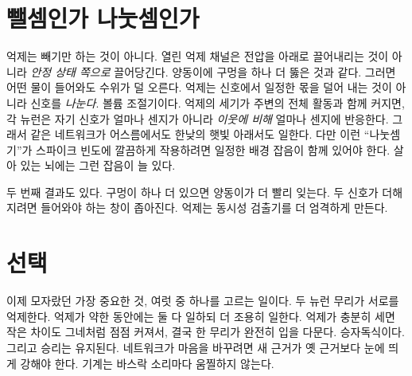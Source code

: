 \section*{뺄셈인가 나눗셈인가}

억제는 빼기만 하는 것이 아니다. 열린 억제 채널은 전압을 아래로 끌어내리는 것이 아니라 \emph{안정 상태 쪽으로} 끌어당긴다. 양동이에 구멍을 하나 더 뚫은 것과 같다. 그러면 어떤 물이 들어와도 수위가 덜 오른다. 억제는 신호에서 일정한 몫을 덜어 내는 것이 아니라 신호를 \emph{나눈다}. 볼륨 조절기이다. 억제의 세기가 주변의 전체 활동과 함께 커지면, 각 뉴런은 자기 신호가 얼마나 센지가 아니라 \emph{이웃에 비해} 얼마나 센지에 반응한다. 그래서 같은 네트워크가 어스름에서도 한낮의 햇빛 아래서도 일한다. 다만 이런 “나눗셈기”가 스파이크 빈도에 깔끔하게 작용하려면 일정한 배경 잡음이 함께 있어야 한다. 살아 있는 뇌에는 그런 잡음이 늘 있다.


두 번째 결과도 있다. 구멍이 하나 더 있으면 양동이가 더 빨리 잊는다. 두 신호가 더해지려면 들어와야 하는 창이 좁아진다. 억제는 동시성 검출기를 더 엄격하게 만든다.

\section*{선택}

이제 모자랐던 가장 중요한 것, 여럿 중 하나를 고르는 일이다. 두 뉴런 무리가 서로를 억제한다. 억제가 약한 동안에는 둘 다 일하되 더 조용히 일한다. 억제가 충분히 세면 작은 차이도 그네처럼 점점 커져서, 결국 한 무리가 완전히 입을 다문다. 승자독식이다. 그리고 승리는 유지된다. 네트워크가 마음을 바꾸려면 새 근거가 옛 근거보다 눈에 띄게 강해야 한다. 기계는 바스락 소리마다 움찔하지 않는다.

